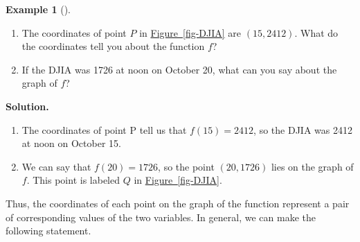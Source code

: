 \documentclass[10pt,]{book}
\theoremstyle{plain}
\theoremstyle{definition}
\theoremstyle{definition}
\theoremstyle{definition}
\newtheorem{example}[theorem]{Example}
\theoremstyle{definition}
\theoremstyle{definition}
\numberwithin{equation}{section}
\begin{document}
\begin{example}[]\label{example-DJIA}
\leavevmode%
\begin{enumerate}[label=*\alph**]
\item\hypertarget{li-117}{}The coordinates of point \(P\) in \hyperref[fig-DJIA]{Figure~\ref{fig-DJIA}} are \((15, 2412)\). What do the coordinates tell you about the function \(f\)?\item\hypertarget{li-118}{}If the DJIA was 1726 at noon on October 20, what can you say about the graph of \(f\)?\end{enumerate}
\par\medskip\noindent%
\textbf{Solution.}\quad \leavevmode%
\begin{enumerate}[label=*\alph**]
\item\hypertarget{li-119}{}The coordinates of point P tell us that \(f(15) = 2412\), so the DJIA was 2412 at noon on October 15.\item\hypertarget{li-120}{}We can say that \(f(20) = 1726\), so the point \((20, 1726)\) lies on the graph of \(f\). This point is labeled \(Q\) in \hyperref[fig-DJIA]{Figure~\ref{fig-DJIA}}.\end{enumerate}
\end{example}
\par
Thus, the coordinates of each point on the graph of the function represent a pair of corresponding
values of the two variables. In general, we can make the following statement.%
\typeout{************************************************}
\typeout{************************************************}
\end{document}
